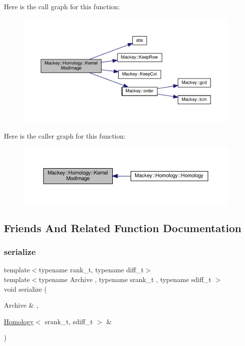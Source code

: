 Here is the call graph for this function\+:\nopagebreak
\begin{figure}[H]
\begin{center}
\leavevmode
\includegraphics[width=350pt]{classMackey_1_1Homology_a902c8dfef7da8ad9f5e03d16eb60a423_cgraph}
\end{center}
\end{figure}
Here is the caller graph for this function\+:\nopagebreak
\begin{figure}[H]
\begin{center}
\leavevmode
\includegraphics[width=350pt]{classMackey_1_1Homology_a902c8dfef7da8ad9f5e03d16eb60a423_icgraph}
\end{center}
\end{figure}


\subsection{Friends And Related Function Documentation}
\mbox{\label{classMackey_1_1Homology_afe2aae7d5b96af426bfe7a7898459cb6}} 
\subsubsection{\texorpdfstring{serialize}{serialize}}
{\footnotesize\ttfamily template$<$typename rank\+\_\+t, typename diff\+\_\+t$>$ \\
template$<$typename Archive , typename srank\+\_\+t , typename sdiff\+\_\+t $>$ \\
void serialize (\begin{DoxyParamCaption}\item[{Archive \&}]{,  }\item[{\hyperlink{classMackey_1_1Homology}{Homology}$<$ srank\+\_\+t, sdiff\+\_\+t $>$ \&}]{ }\end{DoxyParamCaption})\hspace{0.3cm}{\ttfamily [friend]}}



